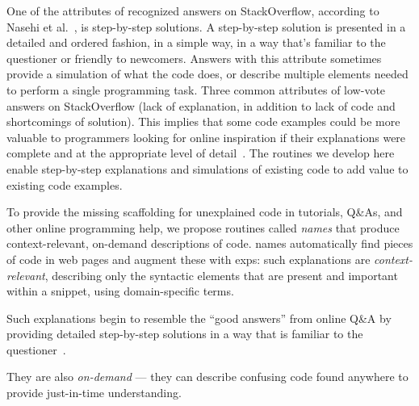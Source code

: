\begin{changes}
One of the attributes of recognized answers on StackOverflow, according to Nasehi et al.~\cite{nasehi_what_2012}, is step-by-step solutions.
A step-by-step solution is presented in a detailed and ordered fashion, in a simple way, in a way that's familiar to the questioner or friendly to newcomers.
Answers with this attribute sometimes provide a simulation of what the code does, or describe multiple elements needed to perform a single programming task. 
Three common attributes of low-vote answers on StackOverflow (lack of explanation, in addition to lack of code and shortcomings of solution).
This implies that some code examples could be more valuable to programmers looking for online inspiration if their explanations were complete and at the appropriate level of detail~\cite{nasehi_what_2012}.
\fi
The routines we develop here enable step-by-step explanations and simulations of existing code to add value to existing code examples.
\end{changes}
\fi

To provide the missing scaffolding for unexplained code in tutorials, Q\&As, and other online programming help, we propose routines called \emph{\Glspl{name}} that produce context-relevant, on-demand descriptions of code.
\Glspl{name} automatically find pieces of code in web pages and augment these with \glspl{exp}: such explanations are \emph{context-relevant}, describing only the syntactic elements that are present and important within a snippet, using domain-specific terms.
\begin{changes}
Such explanations begin to resemble the ``good answers'' from online Q\&A by providing detailed step-by-step solutions in a way that is familiar to the questioner~\cite{nasehi_what_2012}.
\end{changes}
\fi
They are also \emph{on-demand} --- they can describe confusing code found anywhere to provide just-in-time understanding.

